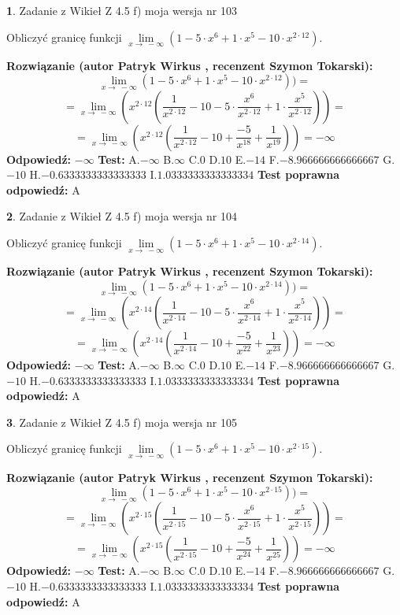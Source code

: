 \documentclass[12pt, a4paper]{article}
\theoremstyle{definition} %
\newtheorem{zad}{}
\newcommand{\zadStart}[1]{\begin{zad}#1\newline}
\newcommand{\zadStop}{\end{zad}}
\newcommand{\rozwStart}[2]{\noindent \textbf{Rozwiązanie (autor #1 , recenzent #2): }\newline}
\newcommand{\rozwStop}{\newline}
\newcommand{\odpStart}{\noindent \textbf{Odpowiedź:}\newline}
\newcommand{\odpStop}{\newline}
\newcommand{\testStart}{\noindent \textbf{Test:}\newline}
\newcommand{\testStop}{\newline}
\newcommand{\kluczStart}{\noindent \textbf{Test poprawna odpowiedź:}\newline}
\newcommand{\kluczStop}{\newline}
\begin{document}
\zadStart{Zadanie z Wikieł Z 4.5 f) moja wersja nr 103}


Obliczyć granicę funkcji  $\lim\limits_{x\to\ -\infty}(1 - 5 \cdot x^{6}+1 \cdot x^{5}- 10 \cdot x^{2\cdot12})$.
\zadStop
\rozwStart{Patryk Wirkus}{Szymon Tokarski}
$$\lim\limits_{x\to\ -\infty}(1 - 5 \cdot x^{6}+1 \cdot x^{5}- 10 \cdot x^{2\cdot12}))=$$
$$=\lim\limits_{x\to\ -\infty}(x^{2\cdot12}(\frac{1}{x^{2\cdot12}}-10 -5 \cdot \frac{x^{6}}{x^{2\cdot12}}+1 \cdot \frac{x^{5}}{x^{2\cdot12}}))=$$
$$=\lim\limits_{x\to\ -\infty}(x^{2\cdot12}(\frac{1}{x^{2\cdot12}}-10 + \frac{-5}{x^{18}}+ \frac{1}{x^{19}}))=-\infty$$
\rozwStop
\odpStart
$-\infty$
\odpStop
\testStart
A.$-\infty$ B.$\infty$ C.$0$ D.$10$ E.$-14$
F.$-8.966666666666667$ G.$-10$
H.$-0.6333333333333333$
I.$1.0333333333333334$
\testStop
\kluczStart
A
\kluczStop



\zadStart{Zadanie z Wikieł Z 4.5 f) moja wersja nr 104}


Obliczyć granicę funkcji  $\lim\limits_{x\to\ -\infty}(1 - 5 \cdot x^{6}+1 \cdot x^{5}- 10 \cdot x^{2\cdot14})$.
\zadStop
\rozwStart{Patryk Wirkus}{Szymon Tokarski}
$$\lim\limits_{x\to\ -\infty}(1 - 5 \cdot x^{6}+1 \cdot x^{5}- 10 \cdot x^{2\cdot14}))=$$
$$=\lim\limits_{x\to\ -\infty}(x^{2\cdot14}(\frac{1}{x^{2\cdot14}}-10 -5 \cdot \frac{x^{6}}{x^{2\cdot14}}+1 \cdot \frac{x^{5}}{x^{2\cdot14}}))=$$
$$=\lim\limits_{x\to\ -\infty}(x^{2\cdot14}(\frac{1}{x^{2\cdot14}}-10 + \frac{-5}{x^{22}}+ \frac{1}{x^{23}}))=-\infty$$
\rozwStop
\odpStart
$-\infty$
\odpStop
\testStart
A.$-\infty$ B.$\infty$ C.$0$ D.$10$ E.$-14$
F.$-8.966666666666667$ G.$-10$
H.$-0.6333333333333333$
I.$1.0333333333333334$
\testStop
\kluczStart
A
\kluczStop



\zadStart{Zadanie z Wikieł Z 4.5 f) moja wersja nr 105}


Obliczyć granicę funkcji  $\lim\limits_{x\to\ -\infty}(1 - 5 \cdot x^{6}+1 \cdot x^{5}- 10 \cdot x^{2\cdot15})$.
\zadStop
\rozwStart{Patryk Wirkus}{Szymon Tokarski}
$$\lim\limits_{x\to\ -\infty}(1 - 5 \cdot x^{6}+1 \cdot x^{5}- 10 \cdot x^{2\cdot15}))=$$
$$=\lim\limits_{x\to\ -\infty}(x^{2\cdot15}(\frac{1}{x^{2\cdot15}}-10 -5 \cdot \frac{x^{6}}{x^{2\cdot15}}+1 \cdot \frac{x^{5}}{x^{2\cdot15}}))=$$
$$=\lim\limits_{x\to\ -\infty}(x^{2\cdot15}(\frac{1}{x^{2\cdot15}}-10 + \frac{-5}{x^{24}}+ \frac{1}{x^{25}}))=-\infty$$
\rozwStop
\odpStart
$-\infty$
\odpStop
\testStart
A.$-\infty$ B.$\infty$ C.$0$ D.$10$ E.$-14$
F.$-8.966666666666667$ G.$-10$
H.$-0.6333333333333333$
I.$1.0333333333333334$
\testStop
\kluczStart
A
\kluczStop
\end{document}
